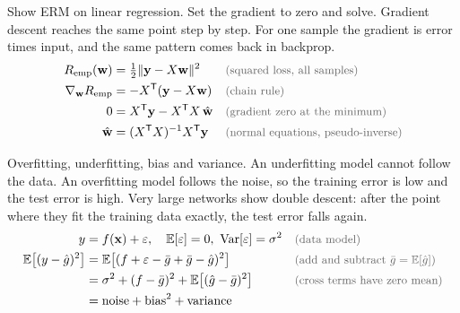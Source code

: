 \begin{qabox}{Show ERM on linear regression.}
\explain Set the gradient to zero and solve. Gradient descent reaches the same point step by step.
For one sample the gradient is error times input, and the same pattern comes back in backprop.
\derive
\begin{align*}
\Remp(\mathbf{w}) &= \tfrac12\lVert \mathbf{y} - X\mathbf{w}\rVert^2 \why{squared loss, all samples} \\
\nabla_{\mathbf{w}}\Remp &= -X^{\mathsf{T}}(\mathbf{y} - X\mathbf{w}) \why{chain rule} \\
0 &= X^{\mathsf{T}}\mathbf{y} - X^{\mathsf{T}}X\,\hat{\mathbf{w}} \why{gradient zero at the minimum} \\
\hat{\mathbf{w}} &= (X^{\mathsf{T}}X)^{-1}X^{\mathsf{T}}\mathbf{y} \why{normal equations, pseudo-inverse}
\end{align*}
\end{qabox}

\begin{qabox}{Overfitting, underfitting, bias and variance.}
\explain An underfitting model cannot follow the data. An overfitting model follows the noise, so the
training error is low and the test error is high. Very large networks show double descent: after
the point where they fit the training data exactly, the test error falls again.
\derive
\begin{align*}
y &= f(\mathbf{x}) + \varepsilon,\quad \mathbb{E}[\varepsilon] = 0,\ \mathrm{Var}[\varepsilon] = \sigma^2 \why{data model} \\
\mathbb{E}\bigl[(y-\hat g)^2\bigr] &= \mathbb{E}\bigl[(f + \varepsilon - \bar g + \bar g - \hat g)^2\bigr] \why{add and subtract $\bar g = \mathbb{E}[\hat g]$} \\
&= \sigma^2 + (f - \bar g)^2 + \mathbb{E}\bigl[(\hat g - \bar g)^2\bigr] \why{cross terms have zero mean} \\
&= \text{noise} + \text{bias}^2 + \text{variance}
\end{align*}
\end{qabox}

